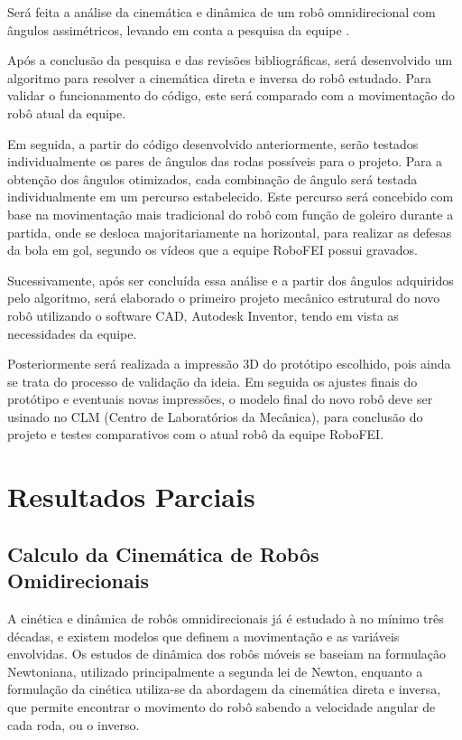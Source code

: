 \documentclass[deposito, acronym, symbols]{fei}
\begin{document}
Será feita a análise da cinemática e dinâmica de um robô omnidirecional com ângulos assimétricos, levando em conta a pesquisa da equipe \textcite{Twente}.

Após a conclusão da pesquisa e das revisões bibliográficas, será desenvolvido um algoritmo para resolver a cinemática direta e inversa do robô estudado. Para validar o funcionamento do código, este será comparado com a movimentação do robô atual da equipe.

Em seguida, a partir do código desenvolvido anteriormente, serão testados individualmente os pares de ângulos das rodas possíveis para o projeto. Para a obtenção dos ângulos otimizados, cada combinação de ângulo será testada individualmente em um percurso estabelecido. Este percurso será concebido com base na movimentação mais tradicional do robô com função de goleiro durante a partida, onde se desloca majoritariamente na horizontal, para realizar as defesas da bola em gol, segundo os vídeos que a equipe RoboFEI possui gravados.

Sucessivamente, após ser concluída essa análise e a partir dos ângulos adquiridos pelo algoritmo, será elaborado o primeiro projeto mecânico estrutural do novo robô utilizando o software CAD, Autodesk Inventor, tendo em vista as necessidades da equipe.

Posteriormente será realizada a impressão 3D do protótipo escolhido, pois ainda se trata do processo de validação da ideia. Em seguida os ajustes finais do protótipo e eventuais novas impressões, o modelo final do novo robô deve ser usinado no CLM (Centro de Laboratórios da Mecânica), para conclusão do projeto e testes comparativos com o atual robô da equipe RoboFEI.


\chapter{Resultados Parciais}

\section{Calculo da Cinemática de Robôs Omidirecionais}

A cinética e dinâmica de robôs omnidirecionais já é estudado à no mínimo três décadas, e existem modelos que definem a movimentação e as variáveis envolvidas. Os estudos de dinâmica dos robôs móveis se baseiam na formulação Newtoniana, utilizado principalmente a segunda lei de Newton, enquanto a formulação da cinética utiliza-se da abordagem da cinemática direta e inversa, que permite encontrar o movimento do robô sabendo a velocidade angular de cada roda, ou o inverso. 
\end{document}
